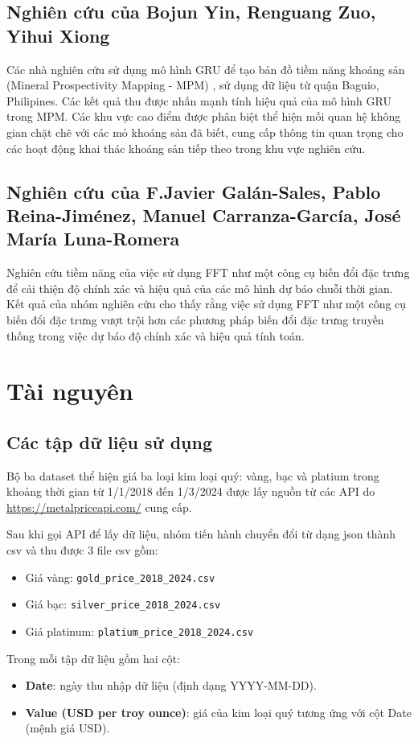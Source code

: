 \documentclass[conference]{IEEEtran}
\begin{document}
\subsection{Nghiên cứu của Bojun Yin, Renguang Zuo, Yihui Xiong}
Các nhà nghiên cứu sử dụng mô hình GRU để tạo bản đồ tiềm năng khoáng sản (Mineral Prospectivity Mapping - MPM) , sử dụng dữ liệu từ quận Baguio, Philipines. Các kết quả thu được nhấn mạnh tính hiệu quả của mô hình GRU trong MPM. Các khu vực cao điểm được phân biệt thể hiện mối quan hệ không gian chặt chẽ với các mỏ khoáng sản đã biết, cung cấp thông tin quan trọng cho các hoạt động khai thác khoáng sản tiếp theo trong khu vực nghiên cứu. 
\subsection{Nghiên cứu của F.Javier Galán-Sales, Pablo Reina-Jiménez, Manuel Carranza-García, José María Luna-Romera}
Nghiên cứu tiềm năng của việc sử dụng FFT như một công cụ biến đổi đặc trưng để cải thiện độ chính xác và hiệu quả của các mô hình dự báo chuỗi thời gian. Kết quả của nhóm nghiên cứu cho thấy rằng việc sử dụng FFT như một công cụ biến đổi đặc trưng vượt trội hơn các phương pháp biến đổi đặc trưng truyền thống trong việc dự báo độ chính xác và hiệu quả tính toán.
\section{Tài nguyên}

\subsection{Các tập dữ liệu sử dụng }\label{AA}
Bộ ba dataset thể hiện giá ba loại kim loại quý: vàng, bạc và platium trong khoảng thời gian từ 1/1/2018 đến 1/3/2024 được lấy nguồn từ các API do \url{https://metalpriceapi.com/} cung cấp. 

Sau khi gọi API để lấy dữ liệu, nhóm tiến hành chuyển đổi từ dạng json thành csv và thu được 3 file csv gồm: 
\begin{itemize}
    \item Giá vàng: \texttt{gold\_price\_2018\_2024.csv}
    \item Giá bạc: \texttt{silver\_price\_2018\_2024.csv}
    \item Giá platinum: \texttt{platium\_price\_2018\_2024.csv}
\end{itemize}
Trong mỗi tập dữ liệu gồm hai cột: 
\begin{itemize}
    \item \textbf{Date}: ngày thu nhập dữ liệu (định dạng YYYY-MM-DD).  
    \item \textbf{Value (USD per troy ounce)}: giá của kim loại quý tương ứng với cột Date (mệnh giá USD).
\end{itemize}
\end{document}
